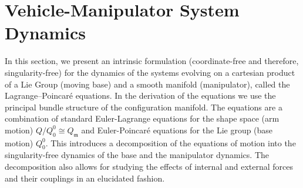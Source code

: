 \documentclass[lettersize,journal]{IEEEtran}
\theoremstyle{remark}
\begin{document}
\section{Vehicle-Manipulator System Dynamics}
\label{chap:Dynamics}
In this section, we present an intrinsic formulation (coordinate-free and therefore, singularity-free) for the dynamics of the systems evolving on a cartesian product of a Lie Group (moving base) and a smooth manifold (manipulator), called the Lagrange–Poincar\'{e} equations. In the derivation of the equations we use the principal bundle structure of the configuration manifold. The equations are a combination of standard Euler-Lagrange equations for the shape space (arm motion) $Q/Q^0_0 \cong Q_\mathfrak{m}$ and Euler-Poincar\'{e} equations for the Lie group (base motion) $Q^0_0$. This introduces a decomposition of the equations of motion into the singularity-free dynamics of the base and the manipulator dynamics. The decomposition also allows for studying the effects of internal and external forces and their couplings in an elucidated fashion. %
\end{document}
